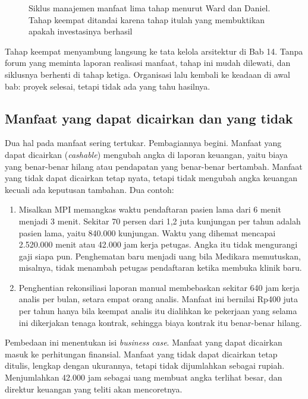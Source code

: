 \begin{figure}[!htb]
  \centering
  
  \caption{Siklus manajemen manfaat lima tahap menurut Ward dan Daniel. Tahap
           keempat ditandai karena tahap itulah yang membuktikan apakah
           investasinya berhasil}
  \label{fig:ch13-siklus}
\end{figure}

Tahap keempat menyambung langsung ke tata kelola arsitektur di Bab 14. Tanpa
forum yang meminta laporan realisasi manfaat, tahap ini mudah dilewati, dan
siklusnya berhenti di tahap ketiga. Organisasi lalu kembali ke keadaan di
awal bab: proyek selesai, tetapi tidak ada yang tahu hasilnya.

\subsection*{Manfaat yang dapat dicairkan dan yang tidak}

Dua hal pada manfaat sering tertukar. Pembagiannya begini. Manfaat yang dapat
dicairkan (\textit{cashable}) mengubah angka di laporan keuangan, yaitu biaya
yang benar-benar hilang atau pendapatan yang benar-benar bertambah. Manfaat
yang tidak dapat dicairkan tetap nyata, tetapi tidak mengubah angka keuangan
kecuali ada keputusan tambahan. Dua contoh:

\begin{enumerate}
  \item Misalkan MPI memangkas waktu pendaftaran pasien lama dari 6 menit
        menjadi 3 menit. Sekitar 70 persen dari 1,2 juta kunjungan per tahun
        adalah pasien lama, yaitu 840.000 kunjungan. Waktu yang dihemat
        mencapai 2.520.000 menit atau 42.000 jam kerja petugas. Angka itu
        tidak mengurangi gaji siapa pun. Penghematan baru menjadi uang bila
        Medikara memutuskan, misalnya, tidak menambah petugas pendaftaran
        ketika membuka klinik baru.
  \item Penghentian rekonsiliasi laporan manual membebaskan sekitar 640 jam
        kerja analis per bulan, setara empat orang analis. Manfaat ini
        bernilai Rp400 juta per tahun hanya bila keempat analis itu dialihkan
        ke pekerjaan yang selama ini dikerjakan tenaga kontrak, sehingga
        biaya kontrak itu benar-benar hilang.
\end{enumerate}

Pembedaan ini menentukan isi \textit{business case}. Manfaat yang dapat
dicairkan masuk ke perhitungan finansial. Manfaat yang tidak dapat dicairkan
tetap ditulis, lengkap dengan ukurannya, tetapi tidak dijumlahkan sebagai
rupiah. Menjumlahkan 42.000 jam sebagai uang membuat angka terlihat besar,
dan direktur keuangan yang teliti akan mencoretnya.

